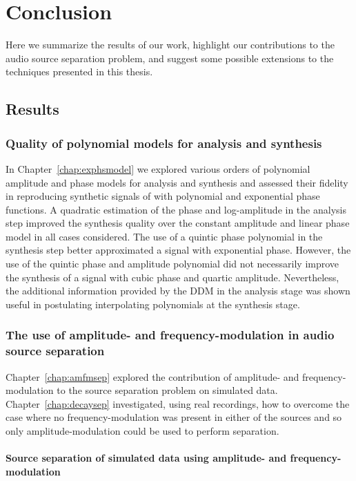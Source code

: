 \chapter{Conclusion\label{chap:conclusion}}

Here we summarize the results of our work, highlight our contributions to the
audio source separation problem, and suggest some possible extensions to the
techniques presented in this thesis.

\section{Results}

\subsection{Quality of polynomial models for analysis and synthesis}

In Chapter~\ref{chap:exphsmodel} we explored various orders of polynomial amplitude and
phase models for analysis and synthesis and assessed their fidelity in
reproducing synthetic signals of with polynomial and exponential phase functions. A
quadratic estimation of the phase and log-amplitude in the analysis step
improved the synthesis quality over the constant amplitude and linear phase
model in all cases considered. The use of a quintic phase
polynomial in the synthesis step better approximated a signal with exponential
phase. However, the use of the quintic phase and amplitude polynomial did not
necessarily improve the synthesis of a signal with cubic phase and quartic
amplitude. Nevertheless, the additional information provided by the DDM in the
analysis stage was shown useful in postulating interpolating polynomials at the
synthesis stage.

\subsection{The use of amplitude- and frequency-modulation in audio source separation}

Chapter~\ref{chap:amfmsep} explored the contribution of amplitude- and
frequency-modulation to the source separation problem on simulated data.
Chapter~\ref{chap:decaysep} investigated, using real recordings, how to overcome
the case where no frequency-modulation was present in either of the sources and
so only amplitude-modulation could be used to perform separation.

\subsubsection{Source separation of simulated data using amplitude- and
frequency-modulation}

